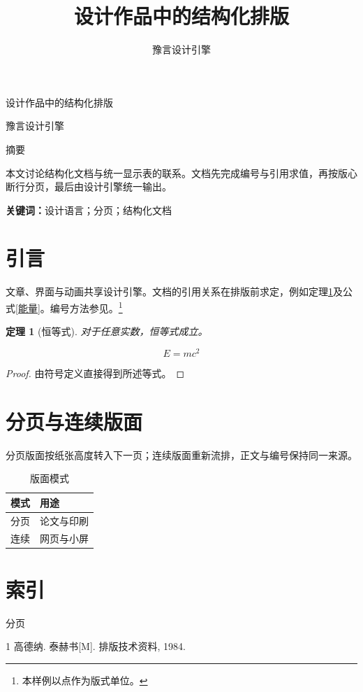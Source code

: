 \documentclass[UTF8,a4paper,11pt,fontset=fandol]{ctexart}
\title{设计作品中的结构化排版}
\author{豫言设计引擎}
\date{}
\newtheorem{定理}{定理}[section]
\numberwithin{equation}{section}
\begin{document}
\begin{center}
{\fontsize{18pt}{24pt}\selectfont 设计作品中的结构化排版}\par
\vspace{4pt}
豫言设计引擎
\end{center}
\noindent 摘要\par
本文讨论结构化文档与统一显示表的联系。文档先完成编号与引用求值，再按版心断行分页，最后由设计引擎统一输出。

\textbf{关键词：}设计语言；分页；结构化文档
\tableofcontents
\section{引言}\label{引言}
文章、界面与动画共享设计引擎。文档的引用关系在排版前求定，例如定理\ref{恒等}及公式\eqref{能量}。编号方法参见\cite{排版}。\footnote{本样例以点作为版式单位。}
\begin{定理}[恒等式]\label{恒等}
对于任意实数，恒等式成立。
\end{定理}
\begin{equation}\label{能量}
E=mc^2
\end{equation}
\begin{proof}
由符号定义直接得到所述等式。
\end{proof}
\clearpage
\section{分页与连续版面}\label{分页节}
分页版面按纸张高度转入下一页；连续版面重新流排，正文与编号保持同一来源。
\begin{table}[ht]
\centering
\caption{版面模式}\label{模式表}
\begin{tabular}{ll}\toprule
模式 & 用途 \\\midrule
分页 & 论文与印刷 \\
连续 & 网页与小屏 \\\bottomrule
\end{tabular}
\end{table}
\section*{索引}
分页
\begin{thebibliography}{1}
 高德纳. 泰赫书[M]. 排版技术资料, 1984.
\end{thebibliography}
\end{document}
